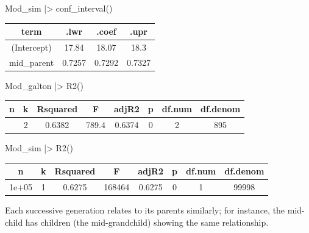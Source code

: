 \documentclass[
  letterpaper,
  DIV=11,
  numbers=noendperiod,
  oneside]{scrartcl}
\newenvironment{Shaded}{\begin{snugshade}}{\end{snugshade}}
\newcommand{\FunctionTok}[1]{\textcolor[rgb]{0.28,0.35,0.67}{#1}}
\newcommand{\NormalTok}[1]{\textcolor[rgb]{0.00,0.23,0.31}{#1}}
\newcommand{\SpecialCharTok}[1]{\textcolor[rgb]{0.37,0.37,0.37}{#1}}
\begin{document}
\begin{Shaded}
\begin{Highlighting}[]
\NormalTok{Mod\_sim    }\SpecialCharTok{|\textgreater{}} \FunctionTok{conf\_interval}\NormalTok{()}
\end{Highlighting}
\end{Shaded}

\begin{longtable}[]{@{}cccc@{}}
\toprule\noalign{}
term & .lwr & .coef & .upr \\
\midrule\noalign{}
\endhead
\bottomrule\noalign{}
\endlastfoot
(Intercept) & 17.84 & 18.07 & 18.3 \\
mid\_parent & 0.7257 & 0.7292 & 0.7327 \\
\end{longtable}

\begin{Shaded}
\begin{Highlighting}[]
\NormalTok{Mod\_galton }\SpecialCharTok{|\textgreater{}} \FunctionTok{R2}\NormalTok{()}
\end{Highlighting}
\end{Shaded}

\begin{longtable}[]{@{}cccccccc@{}}
\toprule\noalign{}
n & k & Rsquared & F & adjR2 & p & df.num & df.denom \\
\midrule\noalign{}
\endhead
\bottomrule\noalign{}
\endlastfoot
898 & 2 & 0.6382 & 789.4 & 0.6374 & 0 & 2 & 895 \\
\end{longtable}

\begin{Shaded}
\begin{Highlighting}[]
\NormalTok{Mod\_sim    }\SpecialCharTok{|\textgreater{}} \FunctionTok{R2}\NormalTok{()}
\end{Highlighting}
\end{Shaded}

\begin{longtable}[]{@{}cccccccc@{}}
\toprule\noalign{}
n & k & Rsquared & F & adjR2 & p & df.num & df.denom \\
\midrule\noalign{}
\endhead
\bottomrule\noalign{}
\endlastfoot
1e+05 & 1 & 0.6275 & 168464 & 0.6275 & 0 & 1 & 99998 \\
\end{longtable}

Each successive generation relates to its parents similarly; for
instance, the mid-child has children (the mid-grandchild) showing the
same relationship.
\end{document}
